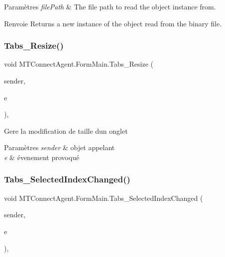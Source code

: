 \begin{DoxyParams}{Paramètres}
{\em file\+Path} & The file path to read the object instance from.\\
\hline
\end{DoxyParams}
\begin{DoxyReturn}{Renvoie}
Returns a new instance of the object read from the binary file.
\end{DoxyReturn}
\mbox{\label{class_m_t_connect_agent_1_1_form_main_aac4a1cf234165d7c9c0b0c4691a88f8d}} 
\subsubsection{\texorpdfstring{Tabs\+\_\+\+Resize()}{Tabs\_Resize()}}
{\footnotesize\ttfamily void M\+T\+Connect\+Agent.\+Form\+Main.\+Tabs\+\_\+\+Resize (\begin{DoxyParamCaption}\item[{object}]{sender,  }\item[{Event\+Args}]{e }\end{DoxyParamCaption})\hspace{0.3cm}{\ttfamily [inline]}, {\ttfamily [private]}}



Gere la modification de taille d\textquotesingle{}un onglet 


\begin{DoxyParams}{Paramètres}
{\em sender} & objet appelant\\
\hline
{\em e} & évenement provoqué\\
\hline
\end{DoxyParams}
\mbox{\label{class_m_t_connect_agent_1_1_form_main_a7bca59d140a9c1514af0c5ab7b7f2166}} 
\subsubsection{\texorpdfstring{Tabs\+\_\+\+Selected\+Index\+Changed()}{Tabs\_SelectedIndexChanged()}}
{\footnotesize\ttfamily void M\+T\+Connect\+Agent.\+Form\+Main.\+Tabs\+\_\+\+Selected\+Index\+Changed (\begin{DoxyParamCaption}\item[{object}]{sender,  }\item[{Event\+Args}]{e }\end{DoxyParamCaption})\hspace{0.3cm}{\ttfamily [inline]}, {\ttfamily [private]}}



